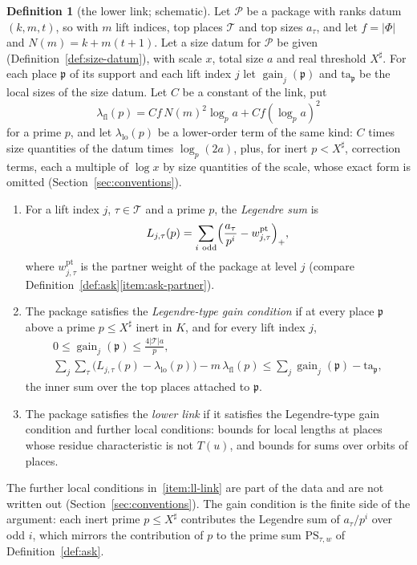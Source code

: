 \documentclass[11pt]{amsbook}
\theoremstyle{plain}
\theoremstyle{definition}
\newtheorem{definition}[theorem]{Definition}
\theoremstyle{remark}
\numberwithin{equation}{section}
\numberwithin{figure}{chapter}
\numberwithin{table}{chapter}
\newcommand{\pt}{\operatorname{pt}}
\newcommand{\PS}{\mathrm{PS}}
\newcommand{\Top}{\mathcal{T}}
\begin{document}
\begin{definition}[the lower link; schematic]\label{def:lower-link}
Let $\mathcal P$ be a package with ranks datum $(k,m,t)$, so with
$m$ lift indices, top places $\Top$ and top sizes $a_\tau$, and let
$f=|\Phi|$ and $N(m)=k+m(t+1)$. Let a size datum for $\mathcal P$ be
given (Definition~\ref{def:size-datum}), with scale $x$, total size
$a$ and real threshold $X^\sharp$. For each place $\mathfrak p$ of its
support and each lift index $j$ let $\operatorname{gain}_j(\mathfrak
p)$ and $\mathrm{ta}_{\mathfrak p}$ be the local sizes of the size
datum. Let $C$ be a constant of the link, put
\[
\lambda_{\mathrm{fl}}(p)=Cf\,N(m)^2\log_pa+Cf(\log_pa)^2
\]
for a prime $p$, and let $\lambda_{\mathrm{lo}}(p)$ be a lower-order
term of the same kind: $C$ times size quantities of the datum times
$\log_p(2a)$, plus, for inert $p<X^\sharp$, correction terms, each a
multiple of $\log x$ by size quantities of the scale, whose exact form
is omitted (Section~\ref{sec:conventions}).
\begin{enumerate}[label=(\arabic*)]
\item For a lift index $j$, $\tau\in\Top$ and a prime $p$, the
\emph{Legendre sum} is
\[
L_{j,\tau}(p)=\sum_{i\ \mathrm{odd}}\Bigl(\frac{a_\tau}{p^i}
-w^{\pt}_{j,\tau}\Bigr)_+,
\]
where $w^{\pt}_{j,\tau}$ is the partner weight of the package at
level $j$ (compare Definition~\ref{def:ask}\ref{item:ask-partner}).
\item The package satisfies the \emph{Legendre-type gain condition} if
at every place $\mathfrak p$ above a prime $p\le X^\sharp$ inert in $K$, and for
every lift index $j$,
\begin{gather*}
0\le\operatorname{gain}_j(\mathfrak p)\le\frac{4|\Top|a}{p},\\
\sum_j\sum_\tau\bigl(L_{j,\tau}(p)-\lambda_{\mathrm{lo}}(p)\bigr)
-m\,\lambda_{\mathrm{fl}}(p)\le\sum_j\operatorname{gain}_j(\mathfrak
p)-\mathrm{ta}_{\mathfrak p},
\end{gather*}
the inner sum over the top places attached to $\mathfrak p$.
\item\label{item:ll-link}
The package satisfies the \emph{lower link} if it satisfies the
Legendre-type gain condition and further local conditions: bounds for
local lengths at places whose residue characteristic is not $T(u)$,
and bounds for sums over orbits of places.
\end{enumerate}
\end{definition}

\noindent The
further local conditions in~\ref{item:ll-link} are part of the data and are not
written out (Section~\ref{sec:conventions}). The gain condition
is the finite side of the argument:
each inert prime $p\le X^\sharp$ contributes the Legendre sum of
$a_\tau/p^i$ over odd $i$, which mirrors the contribution of $p$ to
the prime sum $\PS_{\tau,w}$ of Definition~\ref{def:ask}.
\end{document}
